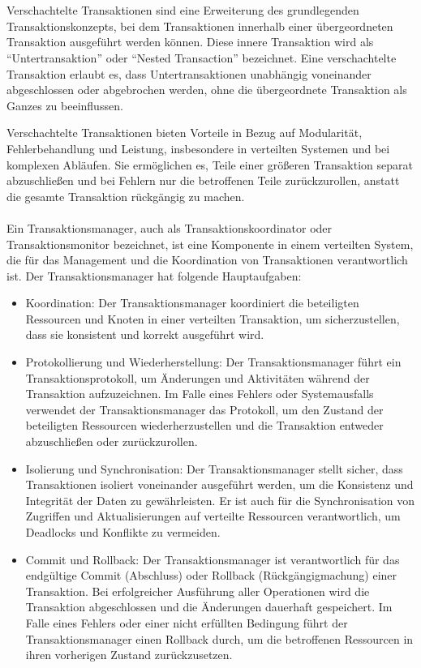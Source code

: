 \\\\
Verschachtelte Transaktionen sind eine Erweiterung des grundlegenden Transaktionskonzepts, bei dem Transaktionen innerhalb einer übergeordneten Transaktion ausgeführt werden können. Diese innere Transaktion wird als \enquote{Untertransaktion} oder \enquote{Nested Transaction} bezeichnet. Eine verschachtelte Transaktion erlaubt es, dass Untertransaktionen unabhängig voneinander abgeschlossen oder abgebrochen werden, ohne die übergeordnete Transaktion als Ganzes zu beeinflussen.

Verschachtelte Transaktionen bieten Vorteile in Bezug auf Modularität, Fehlerbehandlung und Leistung, insbesondere in verteilten Systemen und bei komplexen Abläufen. Sie ermöglichen es, Teile einer größeren Transaktion separat abzuschließen und bei Fehlern nur die betroffenen Teile zurückzurollen, anstatt die gesamte Transaktion rückgängig zu machen.
\\\\
Ein Transaktionsmanager, auch als Transaktionskoordinator oder Transaktionsmonitor bezeichnet, ist eine Komponente in einem verteilten System, die für das Management und die Koordination von Transaktionen verantwortlich ist. Der Transaktionsmanager hat folgende Hauptaufgaben:
\begin{itemize}
\item Koordination: Der Transaktionsmanager koordiniert die beteiligten Ressourcen und Knoten in einer verteilten Transaktion, um sicherzustellen, dass sie konsistent und korrekt ausgeführt wird.
\item Protokollierung und Wiederherstellung: Der Transaktionsmanager führt ein Transaktionsprotokoll, um Änderungen und Aktivitäten während der Transaktion aufzuzeichnen. Im Falle eines Fehlers oder Systemausfalls verwendet der Transaktionsmanager das Protokoll, um den Zustand der beteiligten Ressourcen wiederherzustellen und die Transaktion entweder abzuschließen oder zurückzurollen.
\item Isolierung und Synchronisation: Der Transaktionsmanager stellt sicher, dass Transaktionen isoliert voneinander ausgeführt werden, um die Konsistenz und Integrität der Daten zu gewährleisten. Er ist auch für die Synchronisation von Zugriffen und Aktualisierungen auf verteilte Ressourcen verantwortlich, um Deadlocks und Konflikte zu vermeiden.
\item Commit und Rollback: Der Transaktionsmanager ist verantwortlich für das endgültige Commit (Abschluss) oder Rollback (Rückgängigmachung) einer Transaktion. Bei erfolgreicher Ausführung aller Operationen wird die Transaktion abgeschlossen und die Änderungen dauerhaft gespeichert. Im Falle eines Fehlers oder einer nicht erfüllten Bedingung führt der Transaktionsmanager einen Rollback durch, um die betroffenen Ressourcen in ihren vorherigen Zustand zurückzusetzen.
\end{itemize}
